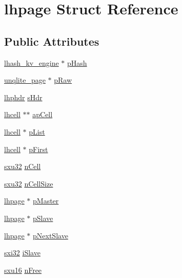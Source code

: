 \hypertarget{structlhpage}{\section{lhpage Struct Reference}
\label{db/d20/structlhpage}
}
\subsection*{Public Attributes}
\begin{DoxyCompactItemize}
\item 
\hyperlink{structlhash__kv__engine}{lhash\-\_\-kv\-\_\-engine} $\ast$ \hyperlink{structlhpage_a134aee2e60ef3292abc62cf062c09657}{p\-Hash}
\item 
\hyperlink{structunqlite__page}{unqlite\-\_\-page} $\ast$ \hyperlink{structlhpage_adc2cb05ad6ba83e723a53c542af2423f}{p\-Raw}
\item 
\hyperlink{structlhphdr}{lhphdr} \hyperlink{structlhpage_a1bdfffe434a576484f603c56e20c4545}{s\-Hdr}
\item 
\hyperlink{structlhcell}{lhcell} $\ast$$\ast$ \hyperlink{structlhpage_a8acf3fd1637af761b21b15ba3bbc976f}{ap\-Cell}
\item 
\hyperlink{structlhcell}{lhcell} $\ast$ \hyperlink{structlhpage_ad60818704d38fff3f173aa87fdc62bac}{p\-List}
\item 
\hyperlink{structlhcell}{lhcell} $\ast$ \hyperlink{structlhpage_a4fcd142ee6fe14ba79dde47403bbff16}{p\-First}
\item 
\hyperlink{unqlite_8c_abc5a8a3f345c200c98c485551f49666e}{sxu32} \hyperlink{structlhpage_a433bbb9307d3df54da0593cd29fc50a1}{n\-Cell}
\item 
\hyperlink{unqlite_8c_abc5a8a3f345c200c98c485551f49666e}{sxu32} \hyperlink{structlhpage_a5e50331371add994c60e1fda10f467d7}{n\-Cell\-Size}
\item 
\hyperlink{structlhpage}{lhpage} $\ast$ \hyperlink{structlhpage_a87760139e3461c57df83d833c1df7307}{p\-Master}
\item 
\hyperlink{structlhpage}{lhpage} $\ast$ \hyperlink{structlhpage_a57cc238949f02875f5695416a6b9f2a6}{p\-Slave}
\item 
\hyperlink{structlhpage}{lhpage} $\ast$ \hyperlink{structlhpage_aa20e9c062a95f07b778cde2ba11d30c8}{p\-Next\-Slave}
\item 
\hyperlink{unqlite_8c_a5a58035d4ae379178e2ca46cc3272fc5}{sxi32} \hyperlink{structlhpage_aad091461ae49e16228bc5daec339200c}{i\-Slave}
\item 
\hyperlink{unqlite_8c_a0fea45724d256332e7ae0104f83260a7}{sxu16} \hyperlink{structlhpage_a273cee73f791159e187e6084d5955b22}{n\-Free}
\end{DoxyCompactItemize}


